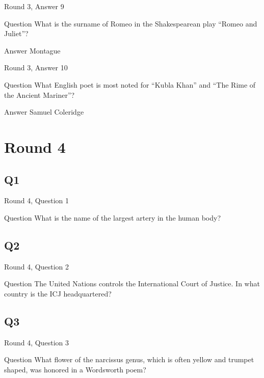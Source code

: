 \documentclass[11pt]{beamer}
\begin{document}
\begin{frame}[t]{Round 3, Answer 9}
\vspace{2em}
\begin{block}{Question}
What is the surname of Romeo in the Shakespearean play ``Romeo and Juliet''\@?
\end{block}
\pause{}
\begin{block}{Answer}
Montague
\end{block}
\end{frame}
    

\begin{frame}[t]{Round 3, Answer 10}
\vspace{2em}
\begin{block}{Question}
What English poet is most noted for ``Kubla Khan'' and ``The Rime of the Ancient Mariner''\@?
\end{block}
\pause{}
\begin{block}{Answer}
Samuel Coleridge
\end{block}
\end{frame}
    

\section{Round 4}
    

\subsection*{Q1}
\begin{frame}[t]{Round 4, Question 1}
\vspace{2em}
\begin{block}{Question}
What is the name of the largest artery in the human body\@?
\end{block}
\end{frame}
    

\subsection*{Q2}
\begin{frame}[t]{Round 4, Question 2}
\vspace{2em}
\begin{block}{Question}
The United Nations controls the International Court of Justice. In what country is the ICJ headquartered\@?
\end{block}
\end{frame}
    

\subsection*{Q3}
\begin{frame}[t]{Round 4, Question 3}
\vspace{2em}
\begin{block}{Question}
What flower of the narcissus genus, which is often yellow and trumpet shaped, was honored in a Wordsworth poem\@?
\end{block}
\end{frame}
    
\end{document}
